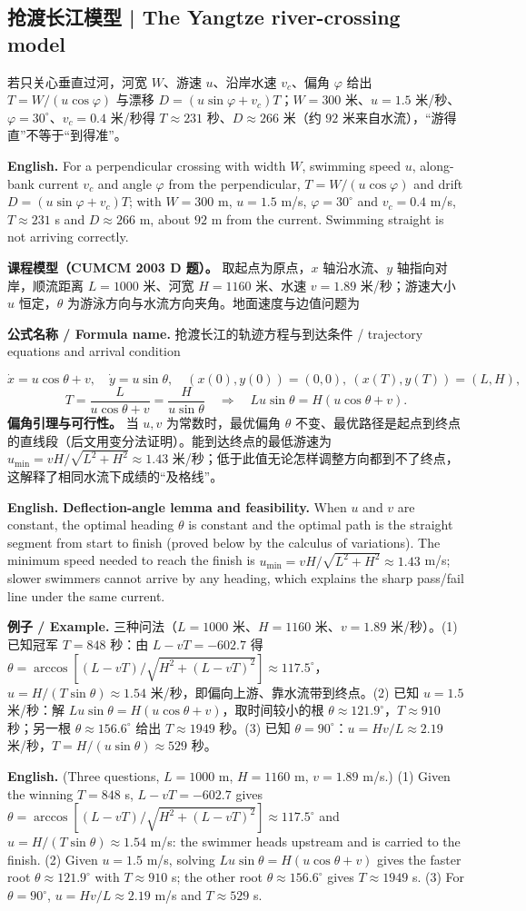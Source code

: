 \documentclass[UTF8,11pt,a4paper]{ctexart}
\newcommand{\EN}[1]{\par\noindent\textbf{English.} #1\par}
\newcommand{\FORMULA}[2]{\par\noindent\textbf{公式名称 / Formula name.} #1 / #2\par}
\newcommand{\EX}[2]{\par\noindent\textbf{例子 / Example.} #1\par\EN{#2}}
\begin{document}
\subsection{抢渡长江模型 | The Yangtze river-crossing model}
若只关心垂直过河，河宽 $W$、游速 $u$、沿岸水速 $v_c$、偏角 $\varphi$ 给出 $T=W/(u\cos\varphi)$ 与漂移 $D=(u\sin\varphi+v_c)T$；$W=300$ 米、$u=1.5$ 米/秒、$\varphi=30^\circ$、$v_c=0.4$ 米/秒得 $T\approx231$ 秒、$D\approx266$ 米（约 $92$ 米来自水流），“游得直”不等于“到得准”。
\EN{For a perpendicular crossing with width $W$, swimming speed $u$, along-bank current $v_c$ and angle $\varphi$ from the perpendicular, $T=W/(u\cos\varphi)$ and drift $D=(u\sin\varphi+v_c)T$; with $W=300$ m, $u=1.5$ m/s, $\varphi=30^\circ$ and $v_c=0.4$ m/s, $T\approx231$ s and $D\approx266$ m, about $92$ m from the current. Swimming straight is not arriving correctly.}
\noindent\textbf{课程模型（CUMCM 2003 D 题）。} 取起点为原点，$x$ 轴沿水流、$y$ 轴指向对岸，顺流距离 $L=1000$ 米、河宽 $H=1160$ 米、水速 $v=1.89$ 米/秒；游速大小 $u$ 恒定，$\theta$ 为游泳方向与水流方向夹角。地面速度与边值问题为
\FORMULA{抢渡长江的轨迹方程与到达条件}{trajectory equations and arrival condition}
\[
\dot x=u\cos\theta+v,\quad \dot y=u\sin\theta,\quad
(x(0),y(0))=(0,0),\ (x(T),y(T))=(L,H),
\]
\[
T=\frac{L}{u\cos\theta+v}=\frac{H}{u\sin\theta}
\quad\Longrightarrow\quad
Lu\sin\theta=H(u\cos\theta+v).
\]
\noindent\textbf{偏角引理与可行性。} 当 $u,v$ 为常数时，最优偏角 $\theta$ 不变、最优路径是起点到终点的直线段（后文用变分法证明）。能到达终点的最低游速为 $u_{\min}=vH/\sqrt{L^2+H^2}\approx1.43$ 米/秒；低于此值无论怎样调整方向都到不了终点，这解释了相同水流下成绩的“及格线”。
\EN{\textbf{Deflection-angle lemma and feasibility.} When $u$ and $v$ are constant, the optimal heading $\theta$ is constant and the optimal path is the straight segment from start to finish (proved below by the calculus of variations). The minimum speed needed to reach the finish is $u_{\min}=vH/\sqrt{L^2+H^2}\approx1.43$ m/s; slower swimmers cannot arrive by any heading, which explains the sharp pass/fail line under the same current.}
\EX{三种问法（$L=1000$ 米、$H=1160$ 米、$v=1.89$ 米/秒）。(1) 已知冠军 $T=848$ 秒：由 $L-vT=-602.7$ 得 $\theta=\arccos[(L-vT)/\sqrt{H^2+(L-vT)^2}]\approx117.5^\circ$，$u=H/(T\sin\theta)\approx1.54$ 米/秒，即偏向上游、靠水流带到终点。(2) 已知 $u=1.5$ 米/秒：解 $Lu\sin\theta=H(u\cos\theta+v)$，取时间较小的根 $\theta\approx121.9^\circ$，$T\approx910$ 秒；另一根 $\theta\approx156.6^\circ$ 给出 $T\approx1949$ 秒。(3) 已知 $\theta=90^\circ$：$u=Hv/L\approx2.19$ 米/秒，$T=H/(u\sin\theta)\approx529$ 秒。}{(Three questions, $L=1000$ m, $H=1160$ m, $v=1.89$ m/s.) (1) Given the winning $T=848$ s, $L-vT=-602.7$ gives $\theta=\arccos[(L-vT)/\sqrt{H^2+(L-vT)^2}]\approx117.5^\circ$ and $u=H/(T\sin\theta)\approx1.54$ m/s: the swimmer heads upstream and is carried to the finish. (2) Given $u=1.5$ m/s, solving $Lu\sin\theta=H(u\cos\theta+v)$ gives the faster root $\theta\approx121.9^\circ$ with $T\approx910$ s; the other root $\theta\approx156.6^\circ$ gives $T\approx1949$ s. (3) For $\theta=90^\circ$, $u=Hv/L\approx2.19$ m/s and $T\approx529$ s.}
\end{document}
